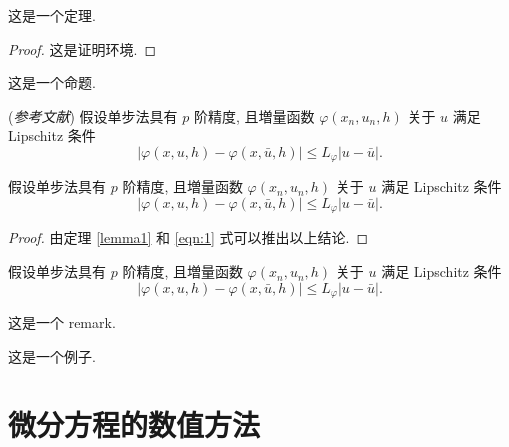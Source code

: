 \documentclass{shnuthesis}
\begin{document}
\begin{theorem}[Theorem]
这是一个定理.
\end{theorem}
\begin{proof}
这是证明环境.
\end{proof}

\begin{proposition}[Proposition]
这是一个命题.
\end{proposition}

\begin{lemma}\label{lemma-convergence} {\rm (\textit{参考文献}\cite{LiLiu1997})}
假设单步法具有 $p$ 阶精度, 且増量函数 $\varphi(x_{n}, u_{n}, h)$ 关于 $u$ 满足 {\rm Lipschitz} 条件
\begin{equation}\label{eqn:3}
|\varphi(x, u, h)-\varphi(x, \bar{u}, h)| \leqslant L_{\varphi}|u-\bar{u}|.
\end{equation}
\end{lemma}

\begin{theorem}\label{theorem-convergence}
假设单步法具有 $p$ 阶精度, 且増量函数 $\varphi(x_{n}, u_{n}, h)$ 关于 $u$ 满足 {\rm Lipschitz} 条件
\begin{equation}\label{eqn:4}
|\varphi(x, u, h)-\varphi(x, \bar{u}, h)| \leqslant L_{\varphi}|u-\bar{u}|.
\end{equation}
\end{theorem}
\begin{proof}
由定理 \ref{lemma1} 和 \eqref{eqn:1} 式可以推出以上结论.
\end{proof}

\begin{corollary}\label{col-convergence}
假设单步法具有 $p$ 阶精度, 且増量函数 $\varphi(x_{n}, u_{n}, h)$ 关于 $u$ 满足 {\rm Lipschitz} 条件
\begin{equation}\label{eqn:5}
|\varphi(x, u, h)-\varphi(x, \bar{u}, h)| \leqslant L_{\varphi}|u-\bar{u}|.
\end{equation}
\end{corollary}


\begin{remark}\label{remark1}
这是一个 remark.
\end{remark}

\begin{example}
这是一个例子.
\end{example}



\chapter{微分方程的数值方法}
\end{document}
